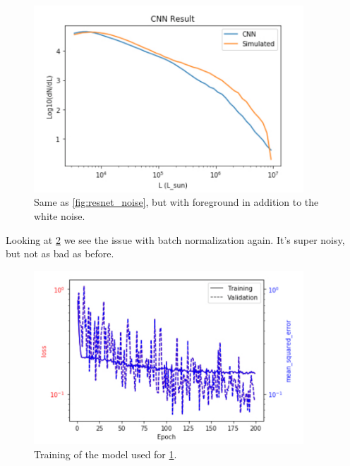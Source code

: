 \documentclass{article}
\begin{document}
		\begin{figure}[H]
			\centering
			\includegraphics[width=0.9\textwidth]{resnet_noisy_foreground.pdf}
			\caption{Same as \cref{fig:resnet_noise}, but with foreground in addition to the white noise.}
			\label{fig:resnet_noisy_foreground}
		\end{figure}

		Looking at \cref{fig:resnet_train} we see the issue with batch normalization again.  It's super noisy, but not as bad as before.

		\begin{figure}[H]
			\centering
			\includegraphics[width=0.9\textwidth]{resnet_train.pdf}
			\caption{Training of the model used for \cref{fig:resnet_noisy_foreground}.}
			\label{fig:resnet_train}
		\end{figure}
\end{document}
